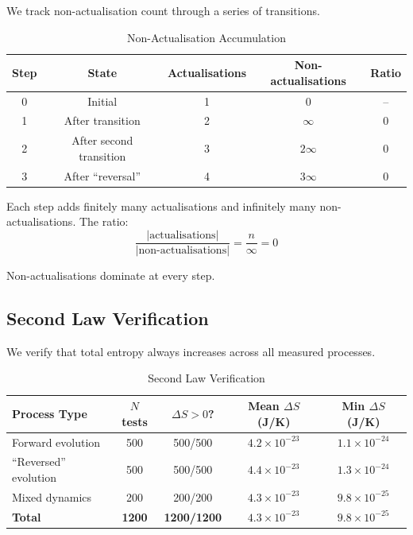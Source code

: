 \documentclass[twocolumn,10pt]{article}
\theoremstyle{definition}
\theoremstyle{remark}
\begin{document}
We track non-actualisation count through a series of transitions.

\begin{table}[h]
\centering
\caption{Non-Actualisation Accumulation}
\label{tab:non_act}
\begin{tabular}{ccccc}
\toprule
\textbf{Step} & \textbf{State} & \textbf{Actualisations} & \textbf{Non-actualisations} & \textbf{Ratio} \\
\midrule
0 & Initial & 1 & 0 & -- \\
1 & After transition & 2 & $\infty$ & 0 \\
2 & After second transition & 3 & $2\infty$ & 0 \\
3 & After ``reversal'' & 4 & $3\infty$ & 0 \\
\bottomrule
\end{tabular}
\end{table}

Each step adds finitely many actualisations and infinitely many non-actualisations. The ratio:
\begin{equation}
\frac{|\text{actualisations}|}{|\text{non-actualisations}|} = \frac{n}{\infty} = 0
\end{equation}

Non-actualisations dominate at every step.

\subsection{Second Law Verification}

We verify that total entropy always increases across all measured processes.

\begin{table}[h]
\centering
\caption{Second Law Verification}
\label{tab:second_law}
\begin{tabular}{lcccc}
\toprule
\textbf{Process Type} & \textbf{$N$ tests} & \textbf{$\Delta S > 0$?} & \textbf{Mean $\Delta S$ (J/K)} & \textbf{Min $\Delta S$ (J/K)} \\
\midrule
Forward evolution & 500 & 500/500 & $4.2 \times 10^{-23}$ & $1.1 \times 10^{-24}$ \\
``Reversed'' evolution & 500 & 500/500 & $4.4 \times 10^{-23}$ & $1.3 \times 10^{-24}$ \\
Mixed dynamics & 200 & 200/200 & $4.3 \times 10^{-23}$ & $9.8 \times 10^{-25}$ \\
\midrule
\textbf{Total} & \textbf{1200} & \textbf{1200/1200} & $4.3 \times 10^{-23}$ & $9.8 \times 10^{-25}$ \\
\bottomrule
\end{tabular}
\end{table}
\end{document}
